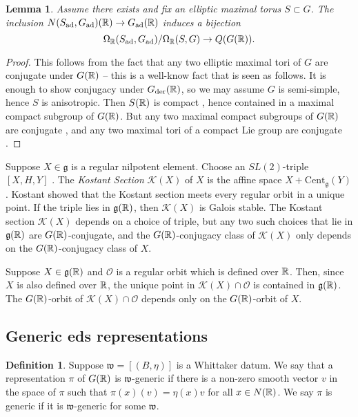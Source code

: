 \documentclass{article}
\newtheorem{lem}[thm]{Lemma}
\theoremstyle{definition}
\newtheorem{dfn}[thm]{Definition}
\numberwithin{equation}{section}
\renewcommand{\-}{\hyp{}}
\newcommand{\g}{\mathfrak g}
\renewcommand{\O}{\mathcal O}
\newcommand{\K}{\mathcal K}
\newcommand{\w}{\mathfrak w}
\newcommand{\Cent}{\mathrm{Cent}}
\begin{document}
\begin{lem} \label{lem:g2}
	Assume there exists and fix an elliptic maximal torus $S \subset G$. The inclusion $N(S_{\textrm{ad}},G_{\textrm{ad}})(\mathbb{R}) \to G_{\textrm{ad}}(\mathbb{R})$ induces a bijection 
	\[ \Omega_{\mathbb{R}}(S_{\textrm{ad}},G_{\textrm{ad}})/\Omega_{\mathbb{R}}(S,G) \to Q(G(\mathbb{R})). \]
\end{lem}
\begin{proof}
	This follows from the fact that any two elliptic maximal tori of $G$ are conjugate under $G(\mathbb{R})$ -- this is a well-know fact that is seen as follows. It is enough to show conjugacy under $G_{\textrm{der}}(\mathbb{R})$, so we may assume $G$ is semi-simple, hence $S$ is anisotropic. Then $S(\mathbb{R})$ is compact \cite[\S24.6(c)]{Bor91}, hence contained in a maximal compact subgroup of $G(\mathbb{R})$. But any two maximal compact subgroups of $G(\mathbb{R})$ are conjugate \cite[\S24.6(a)]{Bor91}, and any two maximal tori of a compact Lie group are conjugate \cite[Corollary 4.35]{KnappLie}.
\end{proof}


Suppose $X\in\g$ is a regular nilpotent element. Choose an
$SL(2)$-triple $[X,H,Y]$ \cite[Chapter 3]{CM}.  The {\it Kostant Section} $\K(X)$ of
$X$ is the affine space $X+\Cent_\g(Y)$.
Kostant showed \cite{Kos63} that the Kostant section meets every regular orbit in a unique point. If the triple lies in $\g(\R)$, then $\K(X)$ is Galois stable. The Kostant section $\K(X)$ depends on a choice of
triple, but any two such choices that lie in $\g(\R)$ are $G(\mathbb{R})$-conjugate, and the $G(\mathbb{R})$-conjugacy class of $\K(X)$ only depends on the $G(\mathbb{R})$-conjugacy class of $X$.

Suppose $X\in \g(\R)$ and $\O$ is a regular orbit which is defined over $\mathbb{R}$.
Then, since $X$ is also defined over $\mathbb{R}$, the unique point in $\K(X)\cap \O$ is contained in $\g(\R)$. The $G(\mathbb{R})$-orbit of $\K(X)\cap \O$ depends only on the $G(\mathbb{R})$-orbit of $X$.

\subsection{Generic eds representations} \label{sub:gen}

\begin{dfn}
Suppose $\w=[(B,\eta)]$ is a Whittaker datum. We say that a representation $\pi$ of $G(\mathbb{R})$ is $\w$-generic if there is a non-zero smooth vector $v$ in the space of $\pi$ such that $\pi(x)(v)=\eta(x)v$ for all $x\in N(\mathbb{R})$. We say $\pi$ is generic if it is $\w$-generic for some $\w$. 
\end{dfn}
\end{document}
